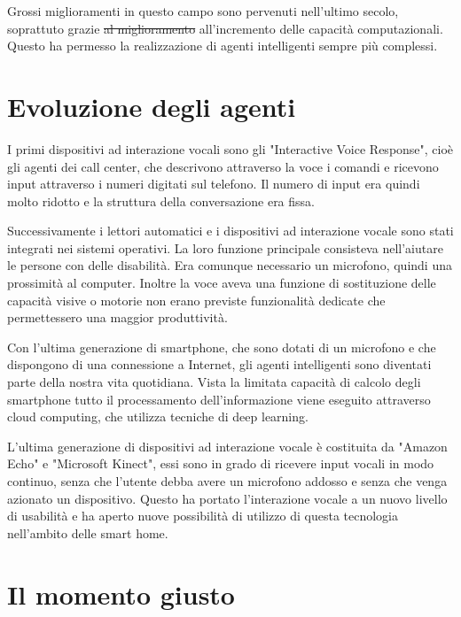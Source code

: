 \documentclass[twoside]{supsistudent}
\begin{document}
Grossi miglioramenti in questo campo sono pervenuti nell'ultimo secolo, soprattuto grazie \sout{al miglioramento} all'incremento delle capacità computazionali. Questo ha permesso la realizzazione di agenti intelligenti sempre più complessi.

\section{Evoluzione degli agenti}

I primi dispositivi ad interazione vocali sono gli "Interactive Voice Response", cioè gli agenti dei call center, che descrivono attraverso la voce i comandi e ricevono input attraverso i numeri digitati sul telefono. Il numero di input era quindi molto ridotto e la struttura della conversazione era fissa.

Successivamente i lettori automatici e i dispositivi ad interazione vocale sono stati integrati nei sistemi operativi. La loro funzione principale consisteva nell'aiutare le persone con delle disabilità. Era comunque necessario un microfono, quindi una prossimità al computer. Inoltre la voce aveva una funzione di sostituzione delle capacità visive o motorie non erano previste funzionalità dedicate che permettessero una maggior produttività.

Con l'ultima generazione di smartphone, che sono dotati di un microfono e che dispongono di una connessione a Internet, gli agenti intelligenti sono diventati parte della nostra vita quotidiana. Vista la limitata capacità di calcolo degli smartphone tutto il processamento dell'informazione viene eseguito attraverso cloud computing, che utilizza tecniche di deep learning.

L'ultima generazione di dispositivi ad interazione vocale è costituita da "Amazon Echo" e "Microsoft Kinect", essi sono in grado di ricevere input vocali in modo continuo, senza che l'utente debba avere un microfono addosso e senza che venga azionato un dispositivo. Questo ha portato l'interazione vocale  a un nuovo livello di usabilità e ha aperto nuove possibilità di utilizzo di questa tecnologia nell'ambito delle smart home.

\section{Il momento giusto}
\end{document}
